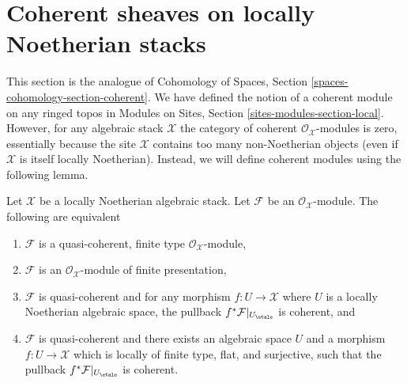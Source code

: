 \section{Coherent sheaves on locally Noetherian stacks}
\label{section-coherent-sheaves}

\noindent
This section is the analogue of
Cohomology of Spaces, Section
\ref{spaces-cohomology-section-coherent}.
We have defined the notion of a coherent module on any ringed topos in
Modules on Sites, Section \ref{sites-modules-section-local}.
However, for any algebraic stack $\mathcal{X}$ the category of
coherent $\mathcal{O}_\mathcal{X}$-modules is zero, essentially because
the site $\mathcal{X}$ contains too many non-Noetherian objects (even
if $\mathcal{X}$ is itself locally Noetherian). Instead, we will define
coherent modules using the following lemma.

\begin{lemma}
\label{lemma-coherent-Noetherian}
Let $\mathcal{X}$ be a locally Noetherian algebraic stack.
Let $\mathcal{F}$ be an $\mathcal{O}_\mathcal{X}$-module.
The following are equivalent
\begin{enumerate}
\item $\mathcal{F}$ is a quasi-coherent, finite type
$\mathcal{O}_\mathcal{X}$-module,
\item $\mathcal{F}$ is an $\mathcal{O}_\mathcal{X}$-module
of finite presentation,
\item $\mathcal{F}$ is quasi-coherent and for any morphism
$f : U \to \mathcal{X}$ where $U$ is a locally Noetherian algebraic space,
the pullback $f^*\mathcal{F}|_{U_\etale}$ is coherent, and
\item $\mathcal{F}$ is quasi-coherent and there exists an algebraic space
$U$ and a morphism $f : U \to \mathcal{X}$ which is locally of finite type,
flat, and surjective, such that the pullback $f^*\mathcal{F}|_{U_\etale}$
is coherent.
\end{enumerate}
\end{lemma}


